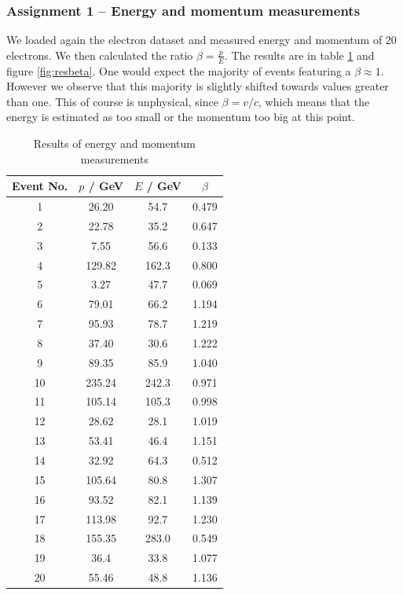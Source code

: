 \documentclass[11pt,a4paper,notitlepage]{scrartcl}
\begin{document}
\subsubsection{Assignment 1 -- Energy and momentum measurements}
We loaded again the electron dataset and measured energy and momentum of 20 electrons. We then calculated the ratio $\beta=\frac{p}{E}$. The results are in table \ref{tab:resbeta} and figure \ref{fig:resbeta}. One would expect the majority of events featuring a $\beta\approx 1$. However we observe that this majority is slightly shifted towards values greater than one. This of course is unphysical, since $\beta=v/c$, which means that the energy is estimated as too small or the momentum too big at this point.
\begin{table}[htbp]
	\centering
	\begin{tabular}{c|c|c|c}
		Event No. & $p$ / GeV & $E$ / GeV & $\beta$  \\
		\hline
		1         & 26.20          & 54.7                & 0.479 \\
		2         & 22.78          & 35.2                & 0.647 \\
		3         & 7.55           & 56.6                & 0.133 \\
		4         & 129.82         & 162.3               & 0.800 \\
		5         & 3.27           & 47.7                & 0.069 \\
		6         & 79.01          & 66.2                & 1.194 \\
		7         & 95.93          & 78.7                & 1.219 \\
		8         & 37.40          & 30.6                & 1.222 \\
		9         & 89.35          & 85.9                & 1.040 \\
		10        & 235.24         & 242.3               & 0.971 \\
		11        & 105.14         & 105.3               & 0.998 \\
		12        & 28.62          & 28.1                & 1.019 \\
		13        & 53.41          & 46.4                & 1.151 \\
		14        & 32.92          & 64.3                & 0.512 \\
		15        & 105.64         & 80.8                & 1.307 \\
		16        & 93.52          & 82.1                & 1.139 \\
		17        & 113.98         & 92.7                & 1.230 \\
		18        & 155.35         & 283.0               & 0.549 \\
		19        & 36.4           & 33.8                & 1.077 \\
		20        & 55.46          & 48.8                & 1.136
	\end{tabular}
\caption{Results of energy and momentum measurements}
\label{tab:resbeta}
\end{table}
\end{document}
